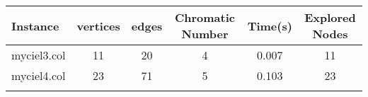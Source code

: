 \documentclass{article}
\begin{document}
\begin{center}
\renewcommand{\arraystretch}{1.4}
 \begin{tabular}{lccccc}
	\hline
\textbf{Instance}  & \textbf{vertices} & \textbf{edges}  & \textbf{Chromatic Number} & \textbf{Time(s)} & \textbf{Explored Nodes} \\\hline

myciel3.col & 11 & 20 & 4 & 0.007 & 11 \\ 
myciel4.col & 23 & 71 & 5 & 0.103 & 23 \\ 

\\
\hline\end{tabular}
\end{center}
\end{document}

